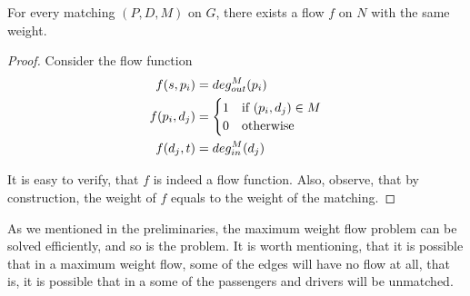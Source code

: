 \begin{lemma}
For every matching $(P, D, M)$ on $G$, there exists a flow $f$ on $N$ with the same weight. 
\end{lemma}

\begin{proof}
Consider the flow function
\begin{align*}
f(s, p_i)		& = deg^M_{out}(p_i)		 				\\
f(p_i, d_j)		& = 
				\begin{cases}
				1 & \text{if } (p_i, d_j) \in M		\\
				0 & \text{otherwise}
				\end{cases}						\\
f(d_j, t) 	& = deg^M_{in}(d_j) 
\end{align*}

It is easy to verify, that $f$ is indeed a flow function.
Also, observe, that by construction,
the weight of $f$ equals to the weight of the matching.
\end{proof}

As we mentioned in the preliminaries, 
the maximum weight flow problem can be solved efficiently, 
and so is the \FIXEDCARPOOL{} problem.
It is worth mentioning, that it is possible that in a maximum weight flow, 
some of the edges will have no flow at all, 
that is, it is possible that in a \FIXEDCARPOOL{}
some of the passengers and drivers will be unmatched.  